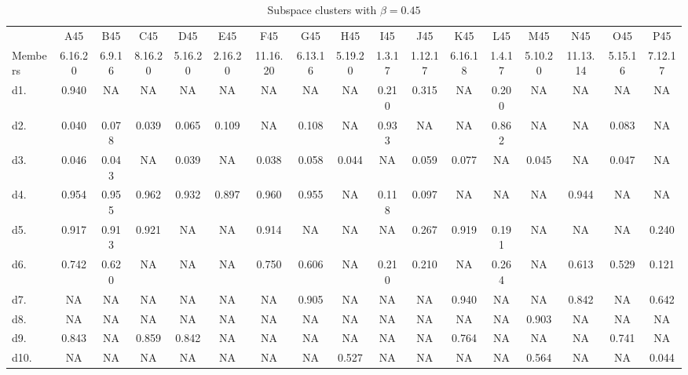 \begin{table}
\renewcommand{\arraystretch}{0.95}
\centering\scriptsize
\setlength\tabcolsep{3pt} %
\caption{Subspace clusters with $\beta=0.45$\vspace*{-6pt}}
\label{tab:large45subspace}%
\begin{tabular}{lcccccccccccccccc}
& A45   & B45   & C45   & D45   & E45   & F45   & G45   & H45   & I45   & J45   & K45   & L45   & M45   & N45   & O45   & P45 \\
Members & 6.16.20 & 6.9.16 & 8.16.20 & 5.16.20 & 2.16.20 & 11.16.20 & 6.13.16 & 5.19.20 & 1.3.17 & 1.12.17 & 6.16.18 & 1.4.17 & 5.10.20 & 11.13.14 & 5.15.16 & 7.12.17 \\\toprule
d1. & 0.940 & NA    & NA    & NA    & NA    & NA    & NA    & NA    & 0.210 & 0.315 & NA    & 0.200 & NA    & NA    & NA    & NA \\
d2. & 0.040 & 0.078 & 0.039 & 0.065 & 0.109 & NA    & 0.108 & NA    & 0.933 & NA    & NA    & 0.862 & NA    & NA    & 0.083 & NA \\
d3. & 0.046 & 0.043 & NA    & 0.039 & NA    & 0.038 & 0.058 & 0.044 & NA    & 0.059 & 0.077 & NA    & 0.045 & NA    & 0.047 & NA \\
d4. & 0.954 & 0.955 & 0.962 & 0.932 & 0.897 & 0.960 & 0.955 & NA    & 0.118 & 0.097 & NA    & NA    & NA    & 0.944 & NA    & NA \\
d5. & 0.917 & 0.913 & 0.921 & NA    & NA    & 0.914 & NA    & NA    & NA    & 0.267 & 0.919 & 0.191 & NA    & NA    & NA    & 0.240 \\
d6. & 0.742 & 0.620 & NA    & NA    & NA    & 0.750 & 0.606 & NA    & 0.210 & 0.210 & NA    & 0.264 & NA    & 0.613 & 0.529 & 0.121 \\
d7. & NA    & NA    & NA    & NA    & NA    & NA    & 0.905 & NA    & NA    & NA    & 0.940 & NA    & NA    & 0.842 & NA    & 0.642 \\
d8. & NA    & NA    & NA    & NA    & NA    & NA    & NA    & NA    & NA    & NA    & NA    & NA    & 0.903 & NA    & NA    & NA \\
d9. & 0.843 & NA    & 0.859 & 0.842 & NA    & NA    & NA    & NA    & NA    & NA    & 0.764 & NA    & NA    & NA    & 0.741 & NA \\
d10. & NA    & NA    & NA    & NA    & NA    & NA    & NA    & 0.527 & NA    & NA    & NA    & NA    & 0.564 & NA    & NA    & 0.044 \\

\end{tabular}
\end{table}
